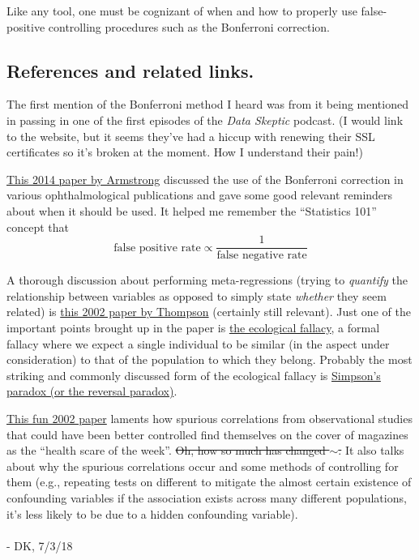 \documentclass[../main/main.tex]{subfiles}
\begin{document}
Like any tool, one must be cognizant of when
and how to properly 
use false-positive controlling procedures
such as the Bonferroni correction.

\subsection*{References and related links.}

The first mention of the Bonferroni method I heard
was from it being mentioned in passing in
one of the first episodes of the
\textit{Data Skeptic} podcast. (I would link
to the website, but it seems they've had a hiccup
with renewing their SSL certificates so it's broken
at the moment. How I understand their pain!)\par

\href{https://www.ncbi.nlm.nih.gov/pubmed/24697967}
{This 2014 paper by Armstrong} discussed
the use
of the Bonferroni correction in various ophthalmological 
publications and gave some good relevant reminders
about when it should be used. 
It helped me remember the ``Statistics 101''
concept that \[\text{false positive rate} \propto \frac{1}{\text{false negative rate}}\] 

A thorough discussion about
performing meta-regressions (trying to \emph{quantify}
the relationship between variables as opposed to
simply state \emph{whether} they seem related) is
\href{https://www.ncbi.nlm.nih.gov/pubmed/12111920}{this 2002 paper by Thompson} (certainly still relevant).
Just one of the important points brought up in the paper is
\href{https://en.wikipedia.org/wiki/Ecological_fallacy}{the ecological fallacy},
a formal fallacy where we expect a single individual
to be similar (in the aspect under consideration) 
to that of the population to which they belong.
Probably the most striking and 
commonly discussed form of the ecological fallacy is
\href{https://en.wikipedia.org/wiki/Simpson%27s_paradox}{Simpson's paradox (or the reversal paradox)}.
\par

\href{https://www.ncbi.nlm.nih.gov/pmc/articles/PMC1124898/}
{This fun 2002 paper} laments how spurious correlations
from observational studies that could have been
better controlled
find themselves on the cover of magazines
as the ``health scare of the week''.
\sout{Oh, how so much has changed \(\sim\).}
It also talks about why the spurious correlations occur
and some methods of controlling for them
(e.g., repeating tests on different to mitigate
the almost certain existence of confounding variables
\textemdash{} if the association exists across
many different populations, it's less likely to
be due to a hidden confounding variable).
\\
\\
- DK, 7/3/18
\end{document}
